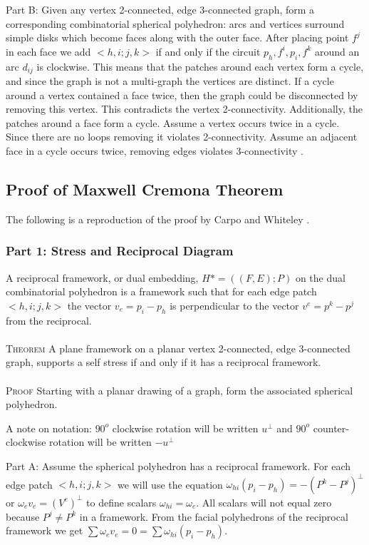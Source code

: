 \documentclass[11pt]{article}
\begin{document}
Part B:
Given any vertex 2-connected, edge 3-connected graph, form a corresponding combinatorial spherical polyhedron: arcs and vertices surround simple disks which become faces along with the outer face. After placing point $f^j$ in each face we add $<h,i;j,k>$ if and only if the circuit $p_h, f^i,p_i,f^k$ around an arc $d_{ij}$ is clockwise. This means that the patches around each vertex form a cycle, and since the graph is not a multi-graph the vertices are distinct. If a cycle around a vertex contained a face twice, then the graph could be disconnected by removing this vertex. This contradicts the vertex 2-connectivity. Additionally, the patches around a face form a cycle. Assume a vertex occurs twice in a cycle. Since there are no loops removing it violates 2-connectivity. Assume an adjacent face in a cycle occurs twice, removing edges violates 3-connectivity \cite{mccProof}.

\subsection{Proof of Maxwell Cremona Theorem}
The following is a reproduction of the proof by Carpo and Whiteley \cite{mccProof}.
\subsubsection{Part 1: Stress and Reciprocal Diagram}
A reciprocal framework, or dual embedding, $H* = ((F,E);P)$ on the dual combinatorial polyhedron is a framework such that for each edge patch $<h,i;j,k>$  the vector $v_e = p_i - p_h$ is perpendicular to the vector $v^e = p^k - p^j$ from the reciprocal. \\
\\
\textsc{Theorem} A plane framework on a planar vertex 2-connected, edge 3-connected graph, supports a self stress if and only if it has a reciprocal framework. \\
\\
\textsc{Proof} Starting with a planar drawing of a graph, form the associated spherical polyhedron. 

A note on notation: $90^o$ clockwise rotation will be written $u^\bot$ and $90^o$ counter-clockwise rotation will be written $-u^\bot$

Part A: Assume the spherical polyhedron has a reciprocal framework.
For each edge patch $<h,i;j,k>$ we will use the equation $\omega_{hi}(p_i - p_h) = -(P^k - P^j)^\bot$ or $\omega_ev_e = (V^e)^\bot$ to define scalars $\omega_{hi} = \omega_e$. All scalars will not equal zero because $P^j \neq P^k$ in a framework. From the facial polyhedrons of the reciprocal framework we get $\sum\omega_ev_e = 0 = \sum\omega_{hi}(p_i - p_h)$.
\end{document}
